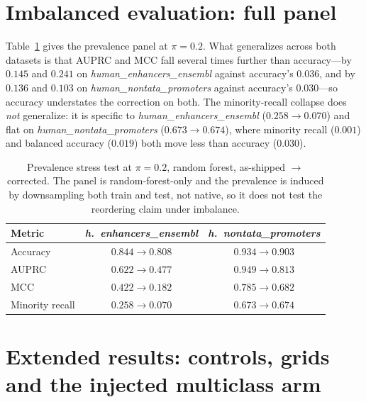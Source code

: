 \documentclass[11pt,a4paper]{article}
\begin{document}
\section{Imbalanced evaluation: full panel}\label{sec:s-imbres}
Table~\ref{tab:imb} gives the prevalence panel at $\pi=0.2$. What generalizes across both datasets
is that AUPRC and MCC fall several times further than accuracy---by $0.145$ and $0.241$ on
\textit{human\_enhancers\_ensembl} against accuracy's $0.036$, and by $0.136$ and $0.103$ on
\textit{human\_nontata\_promoters} against accuracy's $0.030$---so accuracy understates the
correction on both. The minority-recall collapse does \emph{not} generalize: it is specific to
\textit{human\_enhancers\_ensembl} ($0.258\to0.070$) and flat on
\textit{human\_nontata\_promoters} ($0.673\to0.674$), where minority recall ($0.001$) and balanced
accuracy ($0.019$) both move less than accuracy ($0.030$).

\begin{table}[htbp]
\centering
\caption{Prevalence stress test at $\pi=0.2$, random forest, as-shipped $\to$ corrected. The panel
is random-forest-only and the prevalence is induced by downsampling both train and test, not
native, so it does not test the reordering claim under imbalance.}\label{tab:imb}
\footnotesize
\begin{tabular}{@{}lcc@{}}
\toprule
Metric & \textit{h.\ enhancers\_ensembl} & \textit{h.\ nontata\_promoters}\\
\midrule
Accuracy        & $0.844\to0.808$ & $0.934\to0.903$\\
AUPRC           & $0.622\to0.477$ & $0.949\to0.813$\\
MCC             & $0.422\to0.182$ & $0.785\to0.682$\\
Minority recall & $0.258\to0.070$ & $0.673\to0.674$\\
\bottomrule
\end{tabular}
\end{table}

\section{Extended results: controls, grids and the injected multiclass arm}\label{sec:s-tabs}
\end{document}
